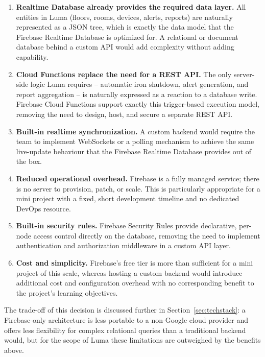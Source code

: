\documentclass[11pt,a4paper]{article}
\begin{document}
\begin{enumerate}[label=(\alph*)]
    \item \textbf{Realtime Database already provides the required data layer.} All entities in Luma (floors, rooms, devices, alerts, reports) are naturally represented as a JSON tree, which is exactly the data model that the Firebase Realtime Database is optimized for. A relational or document database behind a custom API would add complexity without adding capability.
    \item \textbf{Cloud Functions replace the need for a REST API.} The only server-side logic Luma requires -- automatic iron shutdown, alert generation, and report aggregation -- is naturally expressed as a reaction to a database write. Firebase Cloud Functions support exactly this trigger-based execution model, removing the need to design, host, and secure a separate REST API.
    \item \textbf{Built-in realtime synchronization.} A custom backend would require the team to implement WebSockets or a polling mechanism to achieve the same live-update behaviour that the Firebase Realtime Database provides out of the box.
    \item \textbf{Reduced operational overhead.} Firebase is a fully managed service; there is no server to provision, patch, or scale. This is particularly appropriate for a mini project with a fixed, short development timeline and no dedicated DevOps resource.
    \item \textbf{Built-in security rules.} Firebase Security Rules provide declarative, per-node access control directly on the database, removing the need to implement authentication and authorization middleware in a custom API layer.
    \item \textbf{Cost and simplicity.} Firebase's free tier is more than sufficient for a mini project of this scale, whereas hosting a custom backend would introduce additional cost and configuration overhead with no corresponding benefit to the project's learning objectives.
\end{enumerate}

\noindent The trade-off of this decision is discussed further in Section~\ref{sec:techstack}: a Firebase-only architecture is less portable to a non-Google cloud provider and offers less flexibility for complex relational queries than a traditional backend would, but for the scope of Luma these limitations are outweighed by the benefits above.

\end{document}
